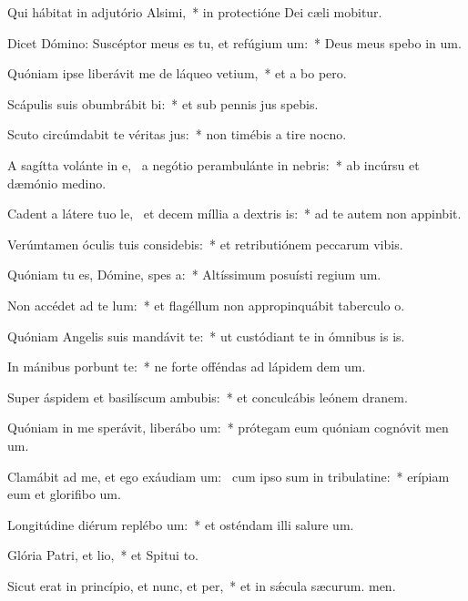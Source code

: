 \item Qui hábitat in adjutório Alsimi,~* in protectióne Dei cæli mobitur.
\item Dicet Dómino: Suscéptor meus es tu, et refúgium um:~* Deus meus spebo in um.
\item Quóniam ipse liberávit me de láqueo vetium,~* et a bo pero.
\item Scápulis suis obumbrábit bi:~* et sub pennis jus spebis.
\item Scuto circúmdabit te véritas jus:~* non timébis a tire nocno.
\item A sagítta volánte in e,~\pscross{} a negótio perambulánte in nebris:~* ab incúrsu et dæmónio medino.
\item Cadent a látere tuo le,~\pscross{} et decem míllia a dextris is:~* ad te autem non appinbit.
\item Verúmtamen óculis tuis considebis:~* et retributiónem peccarum vibis.
\item Quóniam tu es, Dómine, spes a:~* Altíssimum posuísti regium um.
\item Non accédet ad te lum:~* et flagéllum non appropinquábit taberculo o.
\item Quóniam Angelis suis mandávit  te:~* ut custódiant te in ómnibus is is.
\item In mánibus porbunt te:~* ne forte offéndas ad lápidem dem um.
\item Super áspidem et basilíscum ambubis:~* et conculcábis leónem  dranem.
\item Quóniam in me sperávit, liberábo um:~* prótegam eum quóniam cognóvit men um.
\item Clamábit ad me, et ego exáudiam um:~\pscross{} cum ipso sum in tribulatine:~* erípiam eum et glorifibo um.
\item Longitúdine diérum replébo um:~* et osténdam illi salure um.
\item Glória Patri, et lio,~* et Spitui to.
\item Sicut erat in princípio, et nunc, et per,~* et in sǽcula sæcurum. men.
